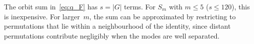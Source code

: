 \begin{remark}\label{rem:scalability}
  The orbit sum in~\eqref{eq:q_F} has $s = |G|$ terms.
  For $S_m$ with $m \leq 5$ ($s \leq 120$), this is inexpensive.
  For larger~$m$, the sum can be approximated by restricting to
  permutations that lie within a neighbourhood of the identity,
  since distant permutations contribute negligibly when the modes
  are well separated.
\end{remark}
